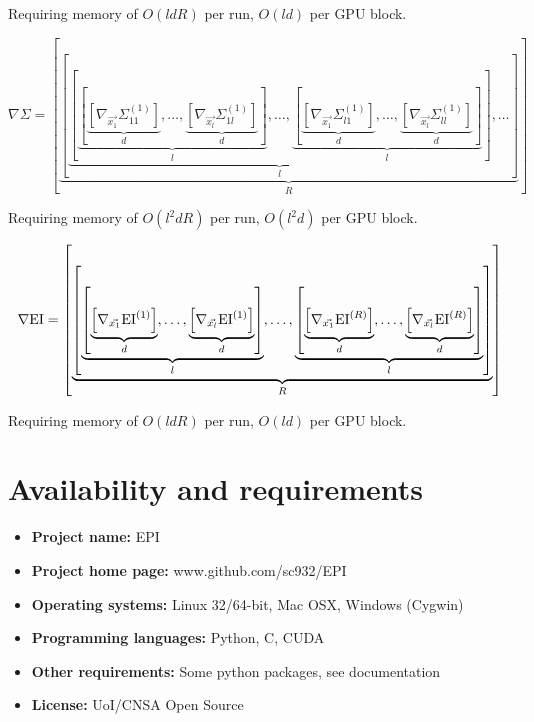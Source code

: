 \documentclass[phd,tocprelim]{cornell}
\begin{document}
Requiring memory of $O(ldR)$ per run, $O(ld)$ per GPU block.

\begin{equation}
    \nabla \Sigma = \left[ \underbrace{ \left[ \underbrace{ \left[ \underbrace{ \left[ \underbrace{ \left[ \nabla_{\vec{x_{1}}} \Sigma_{11}^{(1)} \right]}_{d} , \ldots, \underbrace{ \left[ \nabla_{\vec{x_{l}}} \Sigma_{1l}^{(1)} \right]}_{d}\right]}_{l}, \ldots, \underbrace{ \left[ \underbrace{ \left[ \nabla_{\vec{x_{1}}} \Sigma_{l1}^{(1)} \right]}_{d} , \ldots, \underbrace{ \left[ \nabla_{\vec{x_{l}}} \Sigma_{ll}^{(1)} \right]}_{d}\right]}_{l} \right] }_{l}, \ldots \right]}_{R} \right]
\end{equation}

Requiring memory of $O(l^{2}dR)$ per run, $O(l^{2}d)$ per GPU block.

\begin{equation}
    \nabla {\rm EI} = \left[ \underbrace{ \left[ \underbrace{ \left[ \underbrace{ \left[ \nabla_{\vec{x_{1}}} {\rm EI}^{(1)} \right]}_{d} , \ldots, \underbrace{ \left[ \nabla_{\vec{x_{l}}} {\rm EI}^{(1)} \right]}_{d}\right]}_{l}, \ldots, \underbrace{ \left[ \underbrace{ \left[ \nabla_{\vec{x_{1}}} {\rm EI}^{(R)} \right]}_{d} , \ldots, \underbrace{ \left[ \nabla_{\vec{x_{l}}} {\rm EI}^{(R)} \right]}_{d}\right]}_{l} \right]}_{R} \right]\end{equation}

Requiring memory of $O(ldR)$ per run, $O(ld)$ per GPU block.




\section{Availability and requirements}
 \begin{itemize}
  \item \textbf{Project name:} EPI
  \item \textbf{Project home page:} www.github.com/sc932/EPI
  \item \textbf{Operating systems:} Linux 32/64-bit, Mac OSX, Windows (Cygwin)
  \item \textbf{Programming languages:} Python, C, CUDA
  \item \textbf{Other requirements:} Some python packages, see documentation
  \item \textbf{License:} UoI/CNSA Open Source
 \end{itemize}
\end{document}
